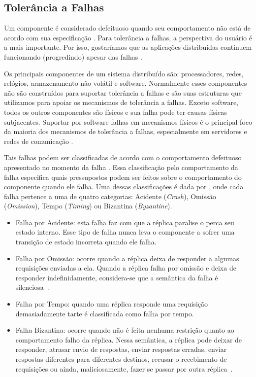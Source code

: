 \subsection{Tolerância a Falhas}

Um componente é considerado defeituoso quando seu comportamento não está de acordo com sua
especificação \cite{schneider90}. Para tolerância a falhas, a perspectiva do usuário é a
mais importante. Por isso, gostaríamos que as aplicações distribuídas continuem
funcionando (progredindo) apesar das falhas \cite{jalote94}.

Os principais componentes de um sistema distribuído são: processadores, redes, relógios,
armazenamento não volátil e software. Normalmente esses componentes não são construídos
para suportar tolerância a falhas e são suas estruturas que utilizamos para apoiar os
mecanismos de tolerância a falhas. Exceto software, todos os outros componentes são
físicos e sua falha pode ter causas físicas subjacentes. Suportar por software falhas em
mecanismos físicos é o principal foco da maioria dos mecanismos de tolerância a falhas,
especialmente em servidores e redes de comunicação \cite{jalote94}.

Tais falhas podem ser classificadas de acordo com o comportamento defeituoso apresentado
no momento da falha \cite{jalote94}. Essa classificação pelo comportamento da falha
especifica quais pressupostos podem ser feitos sobre o comportamento do componente quando
ele falha. Uma dessas classificações é dada por , onde cada falha
pertence a uma de quatro categorias: Acidente (\emph{Crash}), Omissão (\emph{Omission}),
Tempo (\emph{Timing}) ou Bizantina (\emph{Byzantine}).

\begin{itemize}
  \item Falha por Acidente: esta falha faz com que a réplica paralise o perca seu estado
    interno. Esse tipo de falha nunca leva o componente a sofrer uma transição de estado
    incorreta quando ele falha.
  \item Falha por Omissão: ocorre quando a réplica deixa de responder a algumas
    requisições enviadas a ela. Quando a réplica falha por omissão e deixa de responder
    indefinidamente, considera-se que a semântica da falha é silenciosa~\cite{cristian91}.
  \item Falha por Tempo: quando uma réplica responde uma requisição demasiadamente tarte é
    classificada como falha por tempo.
  \item Falha Bizantina: ocorre quando não é feita nenhuma restrição quanto ao
    comportamento falho da réplica. Nessa semântica, a réplica pode deixar de responder,
    atrasar envio de respostas, enviar respostas erradas, enviar respostas diferentes para
    diferentes destinos, recusar o recebimento de requisições ou ainda, maliciosamente,
    fazer se passar por outra réplica~\cite{jalote94}.
\end{itemize}


